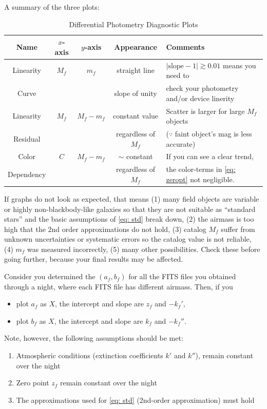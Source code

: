 A summary of the three plots:
\begin{table}[ht!]
\caption{Differential Photometry Diagnostic Plots}
\label{tab: 1-filter diff phot}
\centering
  \begin{tabular}{c|cc|c|l}
  Name & $ x $-axis & $ y $-axis & Appearance & Comments \\
  \hline
  Linearity & $ M_f $ & $ m_f $       & straight line & 
  $ |\mathrm{slope} - 1| \gtrsim 0.01 $ means you need to \\
  Curve & & & slope of unity & check your photometry and/or device linerity \\
  \hline
  Linearity & $ M_f $ & $ M_f - m_f $ & constant value & 
  Scatter is larger for large $ M_f $ objects \\
  Residual & & & regardless of $ M_f $ & ($ \because $ faint object's mag is less accurate) \\
  \hline
  Color & $ C $  & $ M_f - m_f $ & $ \sim $ constant & 
  If you can see a clear trend, \\
  Dependency & & & regardless of $ M_f $ & the color-terms in \cref{eq: zeropt} not negligible.\\
\end{tabular}
\end{table}

If graphs do not look as expected, that means (1) many field objects are variable or highly non-blackbody-like galaxies so that they are not suitable as ``standard stars'' and the basic assumptions of \cref{eq: std} break down, (2) the airmass is too high that the 2nd order approximations do not hold, (3) catalog $ M_f $ suffer from unknown uncertainties or systematic errors so the catalog value is not reliable, (4) $ m_f $ was measured incorrectly, (5) many other possibilities. Check these before going further, because your final results may be affected.


Consider you determined the $ (a_f, b_f) $ for all the FITS files you obtained through a night, where each FITS file has different airmass. Then, if you 
\begin{itemize}
\item plot $ a_f $ as $ X $, the intercept and slope are $ z_f $ and $ -k_f' $,
\item plot $ b_f $ as $ X $, the intercept and slope are $ k_f $ and $ -k_f'' $.
\end{itemize}

Note, however, the following assumptions should be met: 
\begin{enumerate}
\item Atmospheric conditions (extinction coefficients $ k' $ and $ k'' $), remain constant over the night 
\item Zero point $ z_f $ remain constant over the night 
\item The approximations used for \cref{eq: std} (2nd-order approximation) must hold
\end{enumerate}

